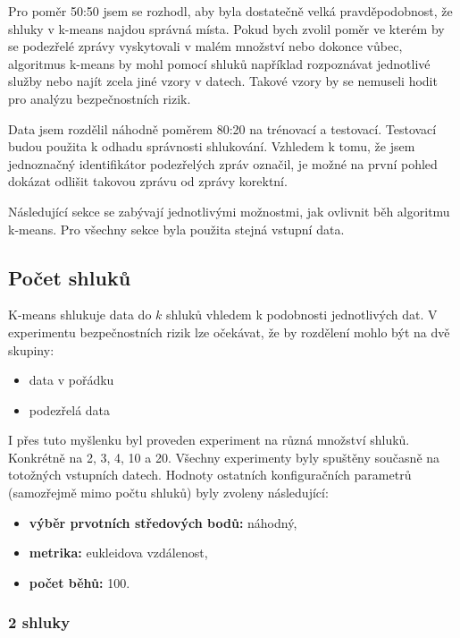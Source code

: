 \documentclass[thesis=M,czech]{FITthesis}[2012/10/20]
\begin{document}
		Pro poměr 50:50 jsem se rozhodl, aby byla dostatečně velká pravděpodobnost, že shluky v k-means najdou správná místa. Pokud bych zvolil poměr ve kterém by se podezřelé zprávy vyskytovali v malém množství nebo dokonce vůbec, algoritmus k-means by mohl pomocí shluků například rozpoznávat jednotlivé služby nebo najít zcela jiné vzory v datech. Takové vzory by se nemuseli hodit pro analýzu bezpečnostních rizik.
		
		Data jsem rozdělil náhodně poměrem 80:20 na trénovací a testovací. Testovací budou použita k odhadu správnosti shlukování. Vzhledem k tomu, že jsem jednoznačný identifikátor podezřelých zpráv označil, je možné na první pohled dokázat odlišit takovou zprávu od zprávy korektní.
		
		Následující sekce se zabývají jednotlivými možnostmi, jak ovlivnit běh algoritmu k-means. Pro všechny sekce byla použita stejná vstupní data.

		\subsection{Počet shluků}
			K-means shlukuje data do $k$ shluků vhledem k podobnosti jednotlivých dat. V experimentu bezpečnostních rizik lze očekávat, že by rozdělení mohlo být na dvě skupiny:
			
			\begin{itemize} 
				\item data v pořádku
				\item podezřelá data		
			\end{itemize}
		
			I přes tuto myšlenku byl proveden experiment na různá množství shluků. Konkrétně na 2, 3, 4, 10 a 20. Všechny experimenty byly spuštěny současně na totožných vstupních datech. Hodnoty ostatních konfiguračních parametrů (samozřejmě mimo počtu shluků) byly zvoleny následující:
			
			\begin{itemize} 
				\item \textbf{výběr prvotních středových bodů: } náhodný,
				\item \textbf{metrika: } eukleidova vzdálenost,
				\item \textbf{počet běhů: } 100.	
			\end{itemize}
				
				\subsubsection{2 shluky}
				
\end{document}
